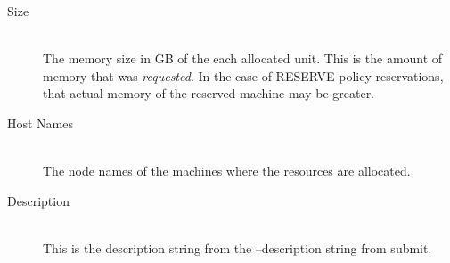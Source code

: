 \begin{description}
\item[Size] \hfill \\
  The memory size in GB of the each allocated unit.  This is the amount of memory that
  was {\em requested}.  In the case of RESERVE policy reservations, that actual memory
  of the reserved machine may be greater.
  
\item[Host Names] \hfill \\
  The node names of the machines where the resources are allocated.
  
\item[Description] \hfill \\
  This is the description string from the --description string from submit.
\end{description}

